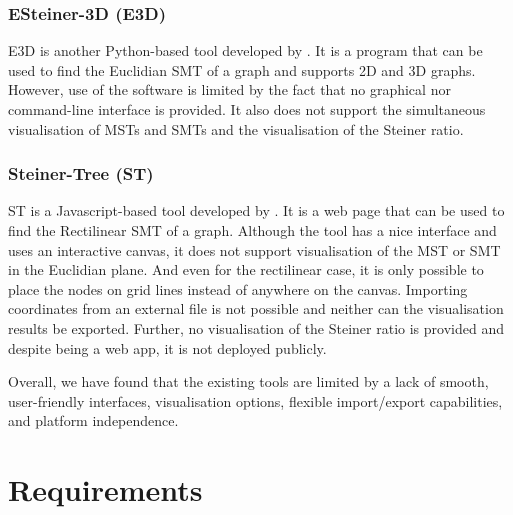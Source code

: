 \documentclass{l4proj}
\begin{document}
\subsection{ESteiner-3D (E3D)}
E3D is another Python-based tool developed by \cite{ESteiner-3D}. It is a program that can be used to find the Euclidian SMT of a graph and supports 2D and 3D graphs. However, use of the software is limited by the fact that no graphical nor command-line interface is provided. It also does not support the simultaneous visualisation of MSTs and SMTs and the visualisation of the Steiner ratio.

\subsection{Steiner-Tree (ST)}
ST is a Javascript-based tool developed by \cite{Steiner-Tree}. It is a web page that can be used to find the Rectilinear SMT of a graph. Although the tool has a nice interface and uses an interactive canvas, it does not support visualisation of the MST or SMT in the Euclidian plane. And even for the rectilinear case, it is only possible to place the nodes on grid lines instead of anywhere on the canvas. Importing coordinates from an external file is not possible and neither can the visualisation results be exported. Further, no visualisation of the Steiner ratio is provided and despite being a web app, it is not deployed publicly.

Overall, we have found that the existing tools are limited by a lack of smooth, user-friendly interfaces, visualisation options, flexible import/export capabilities, and platform independence.

\chapter{Requirements}
\label{sec:requirements}
\end{document}
